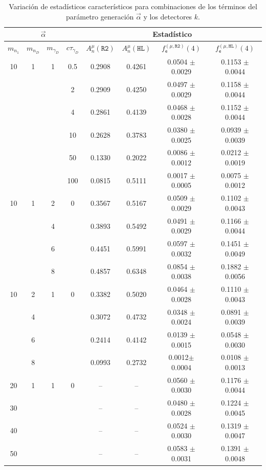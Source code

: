 \begin{table}[!t]
\centering
\footnotesize
\begin{tabular}{|cccc|cccc|}
\toprule
\multicolumn{4}{|c|}{$\vec{\alpha}$} & \multicolumn{4}{|c|}{Estadístico} \\
\hline
$m_{n_1}$ & $m_{n_D}$ & $m_{\gamma_D}$ & $c\tau_{\gamma_D}$ & 
$A_n^\mu(\texttt{R2})$ & 
$A_n^\mu(\texttt{HL})$ & 
$f^{(\mu, \texttt{R2})}_\textsf{e} (4)$ & 
$f^{(\mu, \texttt{HL})}_\textsf{e} (4)$ \\
\midrule
10 & 1 & 1 & 0.5 & 0.2908 & 0.4261 & 0.0504 $\pm$ 0.0029& 0.1153 $\pm$ 0.0044\\
& & & 2 & 0.2909 & 0.4250 & 0.0497 $\pm$ 0.0029& 0.1158 $\pm$ 0.0044\\
& & & 4 & 0.2861 & 0.4139 & 0.0468 $\pm$ 0.0028& 0.1152 $\pm$ 0.0044 \\
& & & 10 & 0.2628 & 0.3783 & 0.0380 $\pm$ 0.0025& 0.0939 $\pm$ 0.0039\\
& & & 50 & 0.1330 & 0.2022 & 0.0086 $\pm$ 0.0012& 0.0212 $\pm$ 0.0019\\
& & & 100 & 0.0815 & 0.5111 & 0.0017 $\pm$ 0.0005& 0.0075 $\pm$ 0.0012\\
\midrule
10 & 1 & 2 & 0 & 0.3567 & 0.5167 & 0.0509 $\pm$ 0.0029& 0.1102 $\pm$ 0.0043\\
& & 4 & & 0.3893 & 0.5492 & 0.0491 $\pm$ 0.0029& 0.1166 $\pm$ 0.0044\\
& & 6 & & 0.4451 & 0.5991 & 0.0597 $\pm$ 0.0032& 0.1451 $\pm$ 0.0049\\
& & 8 & & 0.4857 & 0.6348 & 0.0854 $\pm$ 0.0038& 0.1882 $\pm$ 0.0056\\
\midrule
10 & 2 & 1 & 0 & 0.3382 & 0.5020 & 0.0464 $\pm$ 0.0028& 0.1110 $\pm$ 0.0043\\
& 4 & & & 0.3072 & 0.4732 & 0.0348 $\pm$ 0.0024& 0.0891 $\pm$ 0.0039\\
& 6 & & & 0.2414 & 0.4142 & 0.0139 $\pm$ 0.0015& 0.0548 $\pm$ 0.0030 \\
& 8 & & & 0.0993 & 0.2732 & 0.0012$\pm$ 0.0004& 0.0108 $\pm$ 0.0013\\
\midrule
20 & 1 & 1 & 0 & -- & -- & 0.0560 $\pm$ 0.0030 & 0.1176 $\pm$ 0.0044 \\
30 & & & &  --  & -- & 0.0480 $\pm$ 0.0028 & 0.1224 $\pm$ 0.0045\\
40 & & & & -- & -- &  0.0524 $\pm$ 0.0030 &  0.1319 $\pm$ 0.0047 \\
50 & & & & -- & -- & 0.0583 $\pm$ 0.0031 & 0.1391 $\pm$ 0.0048 \\
\bottomrule 
\end{tabular}
\caption{Variación de estadísticos característicos para combinaciones de los términos del parámetro generación $\vec{\alpha}$ y los detectores $k$.}
\label{Numero_de_Entradas}
\end{table}



